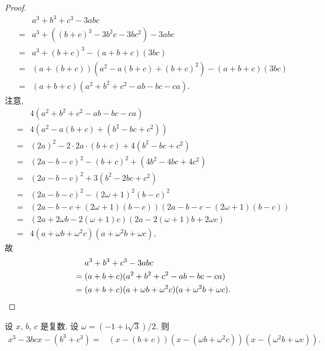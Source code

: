 \documentclass[../libro.tex]{subfiles}
\begin{document}
\begin{proof}
    \begin{align*}
        {}   & a^3 + b^3 + c^3 - 3abc                       \\
        = {} & a^3 + ((b + c)^3 - 3b^2 c - 3bc^2) - 3abc    \\
        = {} & a^3 + (b + c)^3 - (a + b + c)(3bc)           \\
        = {} & (a + (b + c))(a^2 - a(b + c) + (b + c)^2)
        - (a + b + c)(3bc)                                  \\
        = {} & (a + b + c)(a^2 + b^2 + c^2 - ab - bc - ca).
    \end{align*}
    注意,
    \begin{align*}
        {}   & 4(a^2 + b^2 + c^2 - ab - bc - ca)          \\
        = {} & 4(a^2  - a(b + c) + (b^2 - bc + c^2))      \\
        = {} & (2a)^2 - 2 \cdot 2a \cdot (b + c)
        + 4(b^2 - bc + c^2)                               \\
        = {} & (2a - b - c)^2 - (b + c)^2
        + (4b^2 - 4bc + 4c^2)                             \\
        = {} & (2a - b - c)^2 + 3(b^2 - 2bc + c^2)        \\
        = {} & (2a - b - c)^2 - (2\omega + 1)^2 (b - c)^2 \\
        = {} & (2a - b - c + (2\omega + 1)(b - c))
        (2a - b - c - (2\omega + 1)(b - c))               \\
        = {} & (2a + 2\omega b - 2(\omega + 1) c)
        (2a - 2(\omega + 1) b + 2\omega c)                \\
        = {} & 4(a + \omega b + \omega^2 c)
        (a + \omega^2 b + \omega c),
    \end{align*}
    故
    \begin{align*}
        {}   & a^3 + b^3 + c^3 - 3abc                      \\
        = {} & (a + b + c)(a^2 + b^2 + c^2 - ab - bc - ca) \\
        = {} & (a + b + c)(a + \omega b + \omega^2 c)
        (a + \omega^2 b + \omega c).
        \qedhere
    \end{align*}
\end{proof}

\begin{theorem}
    设 \(x\), \(b\), \(c\) 是复数.
    设 \(\omega = (-1 + \mathrm{i} \sqrt{3})/2\).
    则
    \begin{align*}
        x^3 - 3bcx - (b^3 + c^3)
        = {} & (x - (b + c))(x - (\omega b + \omega^2 c))
        (x - (\omega^2 b + \omega c)).
    \end{align*}
\end{theorem}
\end{document}
